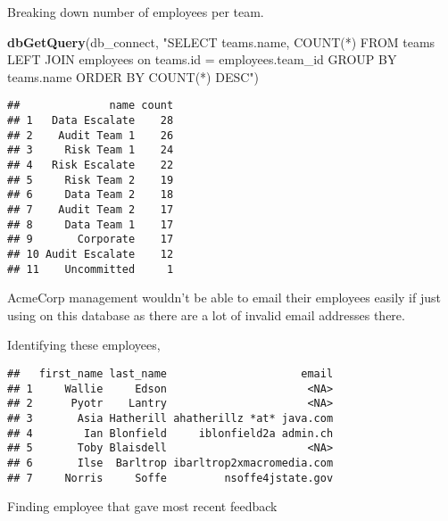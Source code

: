 \documentclass[]{article}
\newenvironment{Shaded}{\begin{snugshade}}{\end{snugshade}}
\newcommand{\CommentTok}[1]{\textcolor[rgb]{0.56,0.35,0.01}{\textit{#1}}}
\newcommand{\KeywordTok}[1]{\textcolor[rgb]{0.13,0.29,0.53}{\textbf{#1}}}
\newcommand{\NormalTok}[1]{#1}
\newcommand{\StringTok}[1]{\textcolor[rgb]{0.31,0.60,0.02}{#1}}
\begin{document}
Breaking down number of employees per team.

\begin{Shaded}
\begin{Highlighting}[]
\KeywordTok{dbGetQuery}\NormalTok{(db_connect,}
           \StringTok{"SELECT teams.name, COUNT(*)}
\StringTok{           FROM teams LEFT JOIN employees}
\StringTok{           on teams.id = employees.team_id}
\StringTok{           GROUP BY teams.name}
\StringTok{           ORDER BY COUNT(*) DESC"}\NormalTok{)}
\end{Highlighting}
\end{Shaded}

\begin{verbatim}
##              name count
## 1   Data Escalate    28
## 2    Audit Team 1    26
## 3     Risk Team 1    24
## 4   Risk Escalate    22
## 5     Risk Team 2    19
## 6     Data Team 2    18
## 7    Audit Team 2    17
## 8     Data Team 1    17
## 9       Corporate    17
## 10 Audit Escalate    12
## 11    Uncommitted     1
\end{verbatim}

AcmeCorp management wouldn't be able to email their employees easily if
just using on this database as there are a lot of invalid email
addresses there.

Identifying these employees,

\begin{Shaded}
\end{Shaded}

\begin{verbatim}
##   first_name last_name                     email
## 1     Wallie     Edson                      <NA>
## 2      Pyotr    Lantry                      <NA>
## 3       Asia Hatherill ahatherillz *at* java.com
## 4        Ian Blonfield     iblonfield2a admin.ch
## 5       Toby Blaisdell                      <NA>
## 6       Ilse  Barltrop ibarltrop2xmacromedia.com
## 7     Norris     Soffe         nsoffe4jstate.gov
\end{verbatim}

Finding employee that gave most recent feedback
\end{document}
